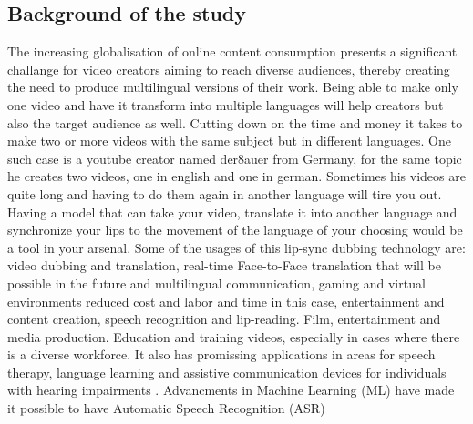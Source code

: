 \documentclass[12pt]{article}
\begin{document}
\subsection{Background of the study}
The increasing globalisation of online content consumption presents a significant challange for video creators aiming to reach diverse audiences, thereby creating the need to produce multilingual versions of their work. Being able to make only one video and have it transform into multiple languages will help creators but also the target audience as well. Cutting down on the time and money it takes to make two or more videos with the same subject but in different languages. One such case is a youtube creator named der8auer from Germany, for the same topic he creates two videos, one in english and one in german. Sometimes his videos are quite long and having to do them again in another language will tire you out. Having a model that can take your video, translate it into another language and synchronize your lips to the movement of the language of your choosing would be a tool in your arsenal. Some of the usages of this lip-sync dubbing technology are: video dubbing and translation, real-time Face-to-Face translation that will be possible in the future and multilingual communication, gaming and virtual environments reduced cost and labor and time in this case, entertainment and content creation, speech recognition and lip-reading. Film, entertainment and media production. Education and training videos, especially in cases where there is a diverse workforce. It also has promissing applications in areas for speech therapy, language learning and assistive communication devices for individuals with hearing impairments \cite{biomedinformatics4010023}. Advancments in Machine Learning (ML) have made it possible to have Automatic Speech Recognition (ASR) 
\end{document}
